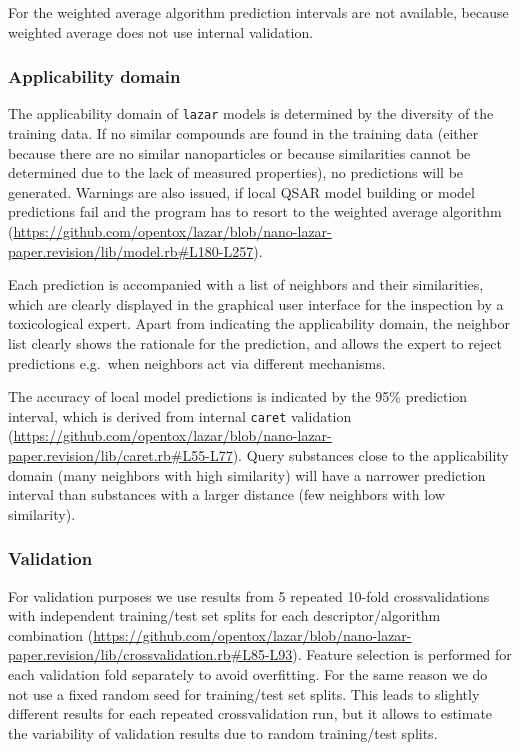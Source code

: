 \documentclass[utf8]{frontiersHLTH} %
\begin{document}
For the weighted average algorithm prediction intervals are not
available, because weighted average does not use internal validation.

\subsubsection{Applicability domain}\label{applicability-domain}

The applicability domain of \texttt{lazar} models is determined by the
diversity of the training data. If no similar compounds are found in the
training data (either because there are no similar nanoparticles or
because similarities cannot be determined due to the lack of measured
properties), no predictions will be generated. Warnings are also issued,
if local QSAR model building or model predictions fail and the program
has to resort to the weighted average algorithm
(\url{https://github.com/opentox/lazar/blob/nano-lazar-paper.revision/lib/model.rb\#L180-L257}).

Each prediction is accompanied with a list of neighbors and their
similarities, which are clearly displayed in the graphical user
interface for the inspection by a toxicological expert. Apart from
indicating the applicability domain, the neighbor list clearly shows the
rationale for the prediction, and allows the expert to reject
predictions e.g.~when neighbors act via different mechanisms.

The accuracy of local model predictions is indicated by the 95\%
prediction interval, which is derived from internal \texttt{caret}
validation
(\url{https://github.com/opentox/lazar/blob/nano-lazar-paper.revision/lib/caret.rb\#L55-L77}).
Query substances close to the applicability domain (many neighbors with
high similarity) will have a narrower prediction interval than
substances with a larger distance (few neighbors with low similarity).

\subsubsection{Validation}\label{validation}

For validation purposes we use results from 5 repeated 10-fold
crossvalidations with independent training/test set splits for each
descriptor/algorithm combination
(\url{https://github.com/opentox/lazar/blob/nano-lazar-paper.revision/lib/crossvalidation.rb\#L85-L93}).
Feature selection is performed for each validation fold separately to
avoid overfitting. For the same reason we do not use a fixed random seed
for training/test set splits. This leads to slightly different results
for each repeated crossvalidation run, but it allows to estimate the
variability of validation results due to random training/test splits.
\end{document}
